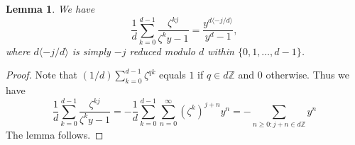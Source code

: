 \documentclass[11pt]{amsart}
\newtheorem{lem}[thm]{Lemma} %
\theoremstyle{definition} %
\theoremstyle{remark} %
\newcommand{\ZZ}{\mathbb Z}
\begin{document}
\begin{lem} 
\label{lem:yformula} 
We have 
\begin{equation*}
\frac{1}{d} \sum_{k=0}^{d-1}
\frac{\zeta^{kj}}{\zeta^ky-1}= 
\frac{y^{d\langle -j/d\rangle}}{y^d-1},   
\end{equation*} 
where $d\langle -j/d\rangle$ is simply $-j$ 
reduced modulo $d$ within $\{0,1,\dots,d-1\}$. 
\end{lem} 
\begin{proof} 
Note that $(1/d)\sum_{k=0}^{d-1} \zeta^{qk}$ 
equals $1$ if $q\in d\ZZ$ and $0$ otherwise. 
Thus we have 
\[
\frac{1}{d} \sum_{k=0}^{d-1}
\frac{\zeta^{kj}}{\zeta^ky-1}= 
-\frac{1}{d} 
\sum_{k=0}^{d-1} 
\sum_{n=0}^\infty 
(\zeta^{k})^{j+n} y^n 
=- 
\sum_{n\ge 0: j+n\in d\ZZ} y^n 
\]
The lemma follows. 
\end{proof} 
\end{document}
